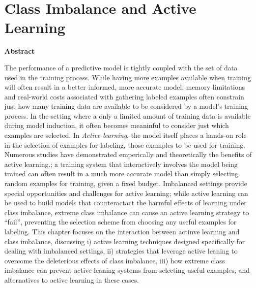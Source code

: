 \documentclass{wileySix}
\begin{document}

\chapter{Class Imbalance and Active Learning}
\date{}

\noindent\textbf{Abstract}

The performance of a predictive model is tightly coupled with the set of data used in the training process. 
While having more examples available when training will often result in a better informed, more accurate model, 
memory limitations and real-world costs associated with gathering labeled examples often constrain just how 
many training data are available to be considered by a model's training process. In the setting where a only a limited
amount of training data is available during model induction, it often becomes meaninful to consider just which examples
are selected. In {\em Active learning}, the model itself places a hands-on role in the selection of examples for 
labeling, those examples to be used for training. Numerous studies have demonstrated emperically and
theoretically the benefits of active learning.; a training system that interactively involves the model being
trained can often result in a much more accurate model than simply selecting random examples for training, 
given a fixed budget.  Imbalanced settings provide special opportunities and challenges for active learning; 
while active learning can be used to build models that counteractact the harmful effects of learning under class
imbalance, extreme class imbalance can cause an active learning strategy to ``fail'', preventing the selection
scheme from choosing any useful examples for labeling. This chapter focuses on the interaction between actinve
learning and class imbalance, discussing i) active learning techniques designed specifically for dealing with 
imbalanced settings, ii) strategies that leverage active leaning to overcome the deleterious effects of class imbalance, 
iii) how extreme class imbalance can prevent active leaning systems from selecting useful examples, and alternatives
to active learning in these cases. 
\end{document}
